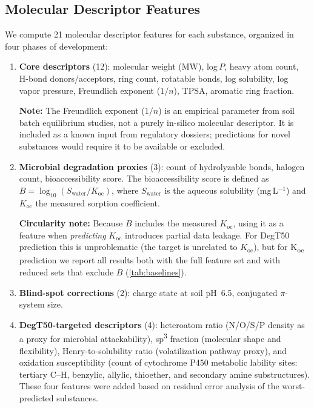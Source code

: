 \documentclass[12pt,a4paper]{article}
\newcommand{\degtl}{DegT50}
\newcommand{\koc}{K\textsubscript{oc}}
\newcommand{\nfeat}{21}
\begin{document}
\subsection{Molecular Descriptor Features}
\label{sec:features}

We compute \nfeat{} molecular descriptor features for each substance,
organized in four phases of development:

\begin{enumerate}[nosep]
  \item \textbf{Core descriptors} (12): molecular weight (MW),
        log\,$P$, heavy atom count, H-bond donors/acceptors, ring count,
        rotatable bonds, log solubility, log vapor pressure, Freundlich
        exponent ($1/n$), TPSA, aromatic ring fraction.

        \textbf{Note:} The Freundlich exponent ($1/n$) is an empirical
        parameter from soil batch equilibrium studies, not a purely
        in-silico molecular descriptor. It is included as a known input
        from regulatory dossiers; predictions for novel substances would
        require it to be available or excluded.
  \item \textbf{Microbial degradation proxies} (3): count of hydrolyzable
        bonds, halogen count, bioaccessibility score. The bioaccessibility
        score is defined as
        $B = \log_{10}(S_\text{water} / K_\text{oc})$,
        where $S_\text{water}$ is the aqueous solubility (mg\,L$^{-1}$) and
        $K_\text{oc}$ the measured sorption coefficient.

        \textbf{Circularity note:} Because $B$ includes the measured
        $K_\text{oc}$, using it as a feature when \emph{predicting}
        $K_\text{oc}$ introduces partial data leakage. For \degtl{}
        prediction this is unproblematic (the target is unrelated to
        $K_\text{oc}$), but for \koc{} prediction we report all results
        both with the full feature set and with reduced sets that
        exclude $B$ (\cref{tab:baselines}).
  \item \textbf{Blind-spot corrections} (2): charge state at soil pH~6.5,
        conjugated $\pi$-system size.
  \item \textbf{DegT50-targeted descriptors} (4): heteroatom ratio
        (N/O/S/P density as a proxy for microbial attackability),
        sp\textsuperscript{3} fraction (molecular shape and flexibility),
        Henry-to-solubility ratio (volatilization pathway proxy), and
        oxidation susceptibility (count of cytochrome P450 metabolic
        lability sites: tertiary C--H, benzylic, allylic, thioether, and
        secondary amine substructures). These four features were added
        based on residual error analysis of the worst-predicted
        substances.


\end{enumerate}
\end{document}
